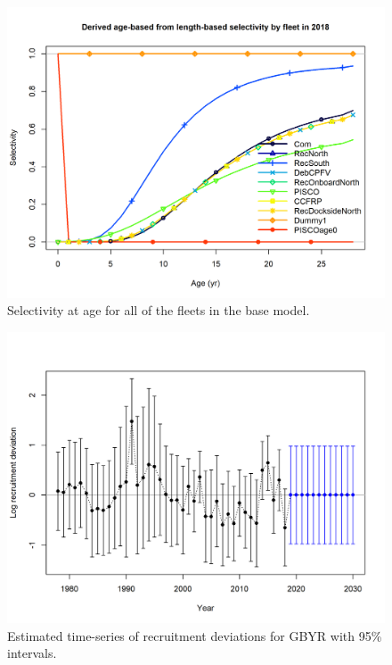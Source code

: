\documentclass[12pt,]{article}
\begin{document}
\begin{figure}
\centering
\includegraphics{r4ss/plots_mod1/sel02_multiple_fleets_age2.png}
\caption{Selectivity at age for all of the fleets in the base model.
\label{fig:sel02_multiple_fleets_age2}}
\end{figure}

\FloatBarrier

\FloatBarrier

\begin{figure}
\centering
\includegraphics{r4ss/plots_mod1/recdevs2_withbars.png}
\caption{Estimated time-series of recruitment deviations for GBYR with
95\% intervals. \label{fig:recdevs2_withbars}}
\end{figure}
\end{document}
